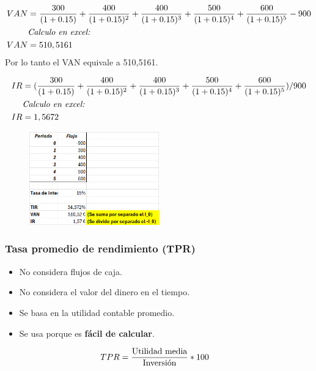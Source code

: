 \documentclass{templateNote}
\begin{document}
\begin{align*}
    VAN &= \frac{300}{(1+0.15)} + \frac{400}{(1+0.15)^2} + \frac{400}{(1+0.15)^3} + \frac{500}{(1+0.15)^4} + \frac{600}{(1+0.15)^5} - 900 \\
    &\textnormal{\textit{Calculo en excel:}}\\
    VAN &= 510,5161
\end{align*}
Por lo tanto el VAN equivale a 510,5161.

\begin{align*}
    IR &= (\frac{300}{(1+0.15)} + \frac{400}{(1+0.15)^2} + \frac{400}{(1+0.15)^3} + \frac{500}{(1+0.15)^4} + \frac{600}{(1+0.15)^5})/900 \\
    &\textnormal{\textit{Calculo en excel:}}\\
    IR &= 1,5672
\end{align*}

\begin{figure}[H]
    \centering
    \includegraphics[width=0.5\textwidth]{img/EjemploCalculo.png}
\end{figure}


\subsubsection*{Tasa promedio de rendimiento (TPR)}

\begin{itemize}
    \item No considera flujos de caja.
    \item No considera el valor del dinero en el tiempo.
    \item Se basa en la utilidad contable promedio.
    \item Se usa porque es \textbf{fácil de calcular}.
\end{itemize}

\begin{align*}
    TPR &= \frac{\textnormal{Utilidad media}}{\textnormal{Inversión}} * 100
\end{align*}
\end{document}
